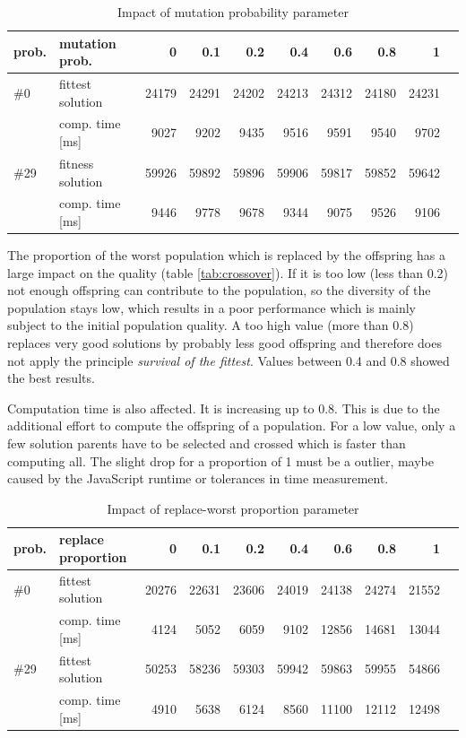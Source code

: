 \documentclass[a4paper]{article}
\begin{document}
\begin{table}[h t b p]
\begin{center}
\begin{tabular}{ l | l | r | r | r | r | r | r | r | r }
prob. & mutation prob. & 0 & 0.1 & 0.2 & 0.4 & 0.6 & 0.8 & 1 \\
\hline
\#0  & fittest solution	& 24179 & 24291 & 24202 & 24213 & 24312 & 24180 & 24231 \\
& 	comp. time [ms]	  	& 9027 & 9202 & 9435 & 9516 & 9591 & 9540 & 9702 \\
\hline
\#29 & fitness solution	& 59926 & 59892 & 59896 & 59906 & 59817 & 59852 & 59642 \\
& 	comp. time [ms]	  	& 9446 & 9778 & 9678 & 9344 & 9075 & 9526 & 9106 \\
\end{tabular}
\caption{Impact of mutation probability parameter}
\label{tab:mutation}
\end{center}
\end{table}

The proportion of the worst population which is replaced by the offspring has a large impact on the quality (table \ref{tab:crossover}). If it is too low (less than 0.2) not enough offspring can contribute to the population, so the diversity of the population stays low, which results in a poor performance which is mainly subject to the initial population quality. A too high value (more than 0.8) replaces very good solutions by probably less good offspring and therefore does not apply the principle \emph{survival of the fittest}. Values between 0.4 and 0.8 showed the best results. 

Computation time is also affected. It is increasing up to 0.8. This is due to  the additional effort to compute the offspring of a population. For a low value, only a few solution parents have to be selected and crossed which is faster than computing all. The slight drop for a proportion of 1 must be a outlier, maybe caused by the JavaScript runtime or tolerances in time measurement.

\begin{table}[h t b p]
\begin{center}
\begin{tabular}{ l | l | r | r | r | r | r | r | r | r }
prob. & replace proportion & 0 & 0.1 & 0.2 & 0.4 & 0.6 & 0.8 & 1 \\
\hline
\#0  & fittest solution	& 20276 & 22631 & 23606 & 24019 & 24138 & 24274 & 21552 \\
& 	comp. time [ms]	  	& 4124 & 5052 & 6059 & 9102 & 12856 & 14681 & 13044 \\
\hline
\#29 & fittest solution	& 50253 & 58236 & 59303 & 59942 & 59863 & 59955 & 54866 \\
& 	comp. time [ms]	  	& 4910 & 5638 & 6124 & 8560 & 11100 & 12112 & 12498 \\
\end{tabular}
\caption{Impact of replace-worst proportion parameter}
\label{tab:replaceworst}
\end{center}
\end{table}
\end{document}

